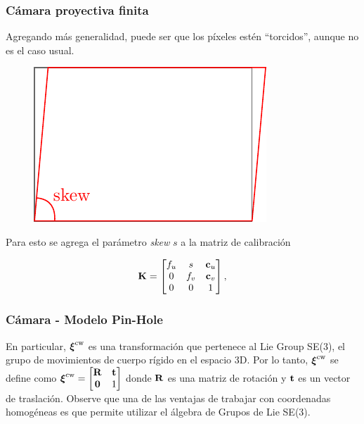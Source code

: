 \begin{frame}
    \frametitle{Cámara proyectiva finita}
    \footnotesize
    
    Agregando más generalidad, puede ser que los píxeles estén ``torcidos'', aunque no es el caso usual.
    
    \begin{figure}[!h]
        \includegraphics[width=0.3\columnwidth]{images/camera/pixel_skew.pdf}
    \end{figure}
    
    Para esto se agrega el parámetro \emph{skew} $s$ a la matriz de calibración
    
    \begin{equation*}
        \boldsymbol{\mathbf{K}}=
        \begin{bmatrix}f_{u} & s & \boldsymbol{\mathbf{c}}_{u}\\
            0 & f_{v} & \boldsymbol{\mathbf{c}}_{v}\\
            0 & 0 & 1
        \end{bmatrix},
    \end{equation*}
    
\end{frame}

\ifadditional

\begin{frame}
    \frametitle{Cámara - Modelo Pin-Hole}
    
    \footnotesize
    
    En particular, $\boldsymbol{\mathbf{\xi}}^{\mathrm{c}\mathrm{w}}$ es una transformación que pertenece al Lie Group SE(3), el grupo de movimientos de cuerpo rígido en el espacio 3D. Por lo tanto, $\boldsymbol{\mathbf{\xi}}^{\mathrm{c}\mathrm{w}}$ se define como
    $\boldsymbol{\mathbf{\xi}}^{\mathrm{c}\mathrm{w}}=
    \begin{bmatrix}\boldsymbol{\mathbf{R}} & \boldsymbol{\mathbf{t}}\\
        \boldsymbol{\mathbf{0}} & 1
    \end{bmatrix}$ donde $\boldsymbol{\mathbf{R}}$ es una matriz de rotación y $\boldsymbol{\mathbf{t}}$ es un vector de traslación. Observe que una de las ventajas de trabajar con coordenadas homogéneas es que permite utilizar el álgebra de Grupos de Lie SE(3).
    
\end{frame}

